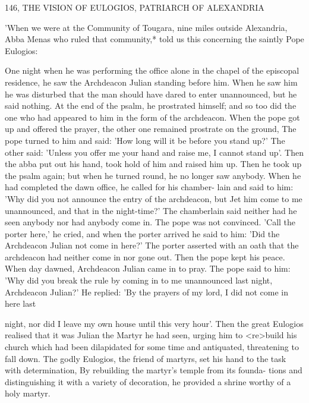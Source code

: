 146, THE VISION OF EULOGIOS,
PATRIARCH OF ALEXANDRIA

'When we were at the Community of Tougara, nine miles outside
Alexandria, Abba Menas who ruled that community,* told us this
concerning the saintly Pope Eulogios:

One night when he was performing the office alone in the chapel of
the episcopal residence, he saw the Archdeacon Julian standing
before him. When he saw him he was disturbed that the man should
have dared to enter unannounced, but he said nothing. At the end
of the psalm, he prostrated himself; and so too did the one who had
appeared to him in the form of the archdeacon. When the pope got
up and offered the prayer, the other one remained prostrate on the
ground, The pope turned to him and said: 'How long will it be
before you stand up?' The other said: 'Unless you offer me your
hand and raise me, I cannot stand up'. Then the abba put out his
hand, took hold of him and raised him up. Then he took up the
psalm again; but when he turned round, he no longer saw anybody.
When he had completed the dawn office, he called for his chamber-
lain and said to him: 'Why did you not announce the entry of the
archdeacon, but Jet him come to me unannounced, and that in the
night-time?' The chamberlain said neither had he seen anybody nor
had anybody come in. The pope was not convinced. 'Call the porter
here,' he cried, and when the porter arrived he said to him: 'Did the
Archdeacon Julian not come in here?' The porter asserted with an
oath that the archdeacon had neither come in nor gone out. Then
the pope kept his peace. When day dawned, Archdeacon Julian
came in to pray. The pope said to him: 'Why did you break the rule
by coming in to me unannounced last night, Archdeacon Julian?' He
replied: 'By the prayers of my lord, I did not come in here last

night, nor did I leave my own house until this very hour'. Then the
great Eulogios realised that it was Julian the Martyr he had seen,
urging him to <re>build his church which had been dilapidated for
some time and antiquated, threatening to fall down. The godly
Eulogios, the friend of martyrs, set his hand to the task with
determination, By rebuilding the martyr's temple from its founda-
tions and distinguishing it with a variety of decoration, he provided
a shrine worthy of a holy martyr.

